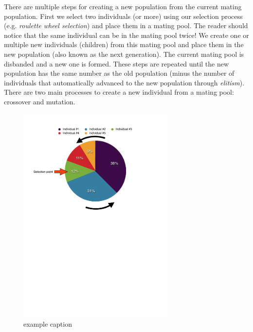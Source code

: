 There are multiple steps for creating a new population from the current mating population. First we select two individuals (or more) using our selection process (e.g. \textit{roulette wheel selection}) and place them in a mating pool. The reader should notice that the same individual can be in the mating pool twice! We create one or multiple new individuals (children) from this mating pool and place them in the new population (also known as the next generation). The current mating pool is disbanded and a new one is formed. These steps are repeated until the new population has the same number as the old population (minus the number of individuals that automatically advanced to the new population through \textit{elitism}). 
There are two main processes to create a new individual from a mating pool: crossover and mutation.
\begin{figure}[htbp] %
   \centering
   \includegraphics[width=0.7\textwidth]{chapter_dalek/plots/rws_cropped.pdf} 
   \caption{example caption}
   \label{fig:roulettewheel}
\end{figure}

